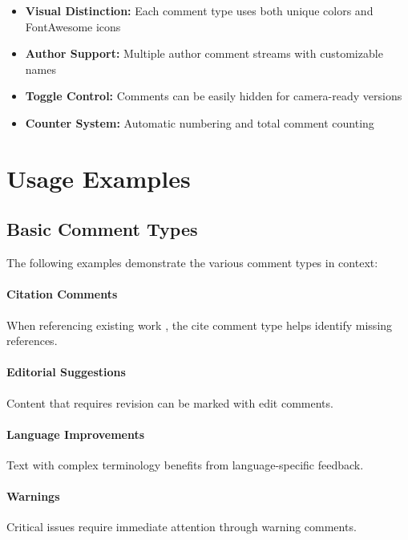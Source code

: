 \documentclass[review]{elsarticle}
\begin{document}
\begin{itemize}
\item \textbf{Visual Distinction:}  Each comment type uses both unique colors and FontAwesome icons
\item \textbf{Author Support:} Multiple author comment streams with customizable names
\item \textbf{Toggle Control:}  Comments can be easily hidden for camera-ready versions
\item \textbf{Counter System:} Automatic numbering and total comment counting
\end{itemize}


\section{Usage Examples}

\subsection{Basic Comment Types}

The following examples demonstrate the various comment types in context:

\paragraph{Citation Comments} When referencing existing work , the cite comment type helps identify missing references.

\paragraph{Editorial Suggestions} Content that requires revision  can be marked with edit comments.

\paragraph{Language Improvements} Text with complex terminology  benefits from language-specific feedback.

\paragraph{Warnings} Critical issues  require immediate attention through warning comments.
\end{document}
